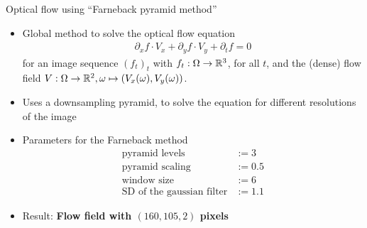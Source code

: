 \begin{frame}{Optical flow using \enquote{Farneback pyramid method}\cite{Farneback2003}}

\begin{itemize}
\item Global method to solve the optical flow equation
\begin{align*}
\partial_x f \cdot V_x + \partial_y f \cdot  V_y + \partial_t f  = 0
\end{align*}
for an image sequence $(f_t)_t$ with $f_t : \Omega \to {\mathbb{R}}^3$, for all $t$, and the (dense) flow field $V : \Omega \to {\mathbb{R}}^2, \omega \mapsto (V_x(\omega), V_y(\omega))$.
\item Uses a downsampling pyramid, to solve the equation for different resolutions of the image
\item Parameters for the Farneback method
\begin{align*}
\text{pyramid levels} &:= 3\\
\text{pyramid scaling} &:= 0.5\\
\text{window size} &:= 6\\
\text{SD of the gaussian filter} &:= 1.1
\end{align*}
\item Result: \textbf{Flow field with $(160,105,2)$ pixels}
\end{itemize}
\end{frame}

